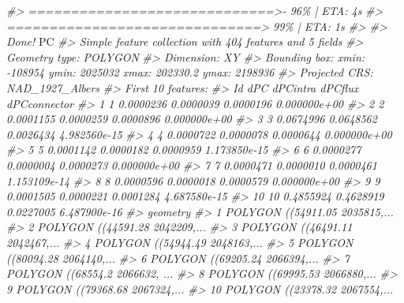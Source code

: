 \documentclass[
]{book}
\newenvironment{Shaded}{\begin{snugshade}}{\end{snugshade}}
\newcommand{\CommentTok}[1]{\textcolor[rgb]{0.56,0.35,0.01}{\textit{#1}}}
\newcommand{\NormalTok}[1]{#1}
\begin{document}
\begin{Shaded}
\begin{Highlighting}[]
\CommentTok{\#\textgreater{}  =============================\textgreater{}{-}   96\% |  ETA:  4s}
\CommentTok{\#\textgreater{}  ==============================\textgreater{}   99\% |  ETA:  1s}
\CommentTok{\#\textgreater{} }
\CommentTok{\#\textgreater{} Done!}
\NormalTok{PC}
\CommentTok{\#\textgreater{} Simple feature collection with 404 features and 5 fields}
\CommentTok{\#\textgreater{} Geometry type: POLYGON}
\CommentTok{\#\textgreater{} Dimension:     XY}
\CommentTok{\#\textgreater{} Bounding box:  xmin: {-}108954 ymin: 2025032 xmax: 202330.2 ymax: 2198936}
\CommentTok{\#\textgreater{} Projected CRS: NAD\_1927\_Albers}
\CommentTok{\#\textgreater{} First 10 features:}
\CommentTok{\#\textgreater{}    Id       dPC  dPCintra   dPCflux dPCconnector}
\CommentTok{\#\textgreater{} 1   1 0.0000236 0.0000039 0.0000196 0.000000e+00}
\CommentTok{\#\textgreater{} 2   2 0.0001155 0.0000259 0.0000896 0.000000e+00}
\CommentTok{\#\textgreater{} 3   3 0.0674996 0.0648562 0.0026434 4.982560e{-}15}
\CommentTok{\#\textgreater{} 4   4 0.0000722 0.0000078 0.0000644 0.000000e+00}
\CommentTok{\#\textgreater{} 5   5 0.0001142 0.0000182 0.0000959 1.173850e{-}15}
\CommentTok{\#\textgreater{} 6   6 0.0000277 0.0000004 0.0000273 0.000000e+00}
\CommentTok{\#\textgreater{} 7   7 0.0000471 0.0000010 0.0000461 1.153109e{-}14}
\CommentTok{\#\textgreater{} 8   8 0.0000596 0.0000018 0.0000579 0.000000e+00}
\CommentTok{\#\textgreater{} 9   9 0.0001505 0.0000221 0.0001284 4.687580e{-}15}
\CommentTok{\#\textgreater{} 10 10 0.4855924 0.4628919 0.0227005 6.487900e{-}16}
\CommentTok{\#\textgreater{}                          geometry}
\CommentTok{\#\textgreater{} 1  POLYGON ((54911.05 2035815,...}
\CommentTok{\#\textgreater{} 2  POLYGON ((44591.28 2042209,...}
\CommentTok{\#\textgreater{} 3  POLYGON ((46491.11 2042467,...}
\CommentTok{\#\textgreater{} 4  POLYGON ((54944.49 2048163,...}
\CommentTok{\#\textgreater{} 5  POLYGON ((80094.28 2064140,...}
\CommentTok{\#\textgreater{} 6  POLYGON ((69205.24 2066394,...}
\CommentTok{\#\textgreater{} 7  POLYGON ((68554.2 2066632, ...}
\CommentTok{\#\textgreater{} 8  POLYGON ((69995.53 2066880,...}
\CommentTok{\#\textgreater{} 9  POLYGON ((79368.68 2067324,...}
\CommentTok{\#\textgreater{} 10 POLYGON ((23378.32 2067554,...}
\end{Highlighting}
\end{Shaded}
\end{document}
